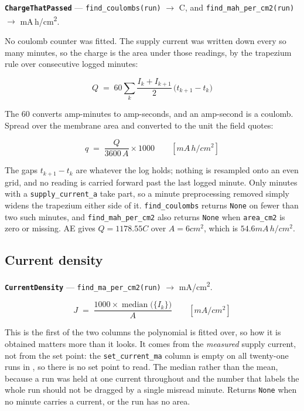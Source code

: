 \textbf{\texttt{ChargeThatPassed}} --- \texttt{find\_coulombs(run)} $\rightarrow$ C, and
\texttt{find\_mah\_per\_cm2(run)} $\rightarrow$ mA\,h/cm\textsuperscript{2}.

No coulomb counter was fitted. The supply current was written down every so many minutes, so the
charge is the area under those readings, by the trapezium rule over consecutive logged minutes:

\begin{equation}
  Q \;=\; 60 \sum_{k} \frac{I_k + I_{k+1}}{2}\,\bigl(t_{k+1} - t_k\bigr)
  \label{eq:charge}
\end{equation}

The $60$ converts amp-minutes to amp-seconds, and an amp-second is a coulomb. Spread over the
membrane area and converted to the unit the field quotes:

\begin{equation}
  q \;=\; \frac{Q}{3600\,A} \times 1000
  \qquad [\unit{mA\,h/cm^2}]
  \label{eq:charge-density}
\end{equation}

The gaps $t_{k+1}-t_k$ are whatever the log holds; nothing is resampled onto an even grid, and no
reading is carried forward past the last logged minute. Only minutes with a
\texttt{supply\_current\_a} take part, so a minute preprocessing removed simply widens the
trapezium either side of it. \texttt{find\_coulombs} returns \texttt{None} on fewer than two such
minutes, and \texttt{find\_mah\_per\_cm2} also returns \texttt{None} when
\texttt{area\_cm2} is zero or missing. AE gives $Q = 1178.55\unit{C}$ over
$A = 6\unit{cm^2}$, which is $54.6\unit{mA\,h/cm^2}$.

\subsection{Current density}

\textbf{\texttt{CurrentDensity}} --- \texttt{find\_ma\_per\_cm2(run)} $\rightarrow$
mA/cm\textsuperscript{2}.

\begin{equation}
  J \;=\; \frac{1000 \times \operatorname{median}\bigl(\{I_k\}\bigr)}{A}
  \qquad [\unit{mA/cm^2}]
  \label{eq:current-density}
\end{equation}

This is the first of the two columns the polynomial is fitted over, so how it is obtained
matters more than it looks. It comes from the \emph{measured} supply current, not from the set
point: the \texttt{set\_current\_ma} column is empty on all twenty-one runs in ,
so there is no set point to read. The median rather than the mean, because a run was held at one
current throughout and the number that labels the whole run should not be dragged by a single
misread minute. Returns \texttt{None} when no minute carries a current, or the run has no area.

